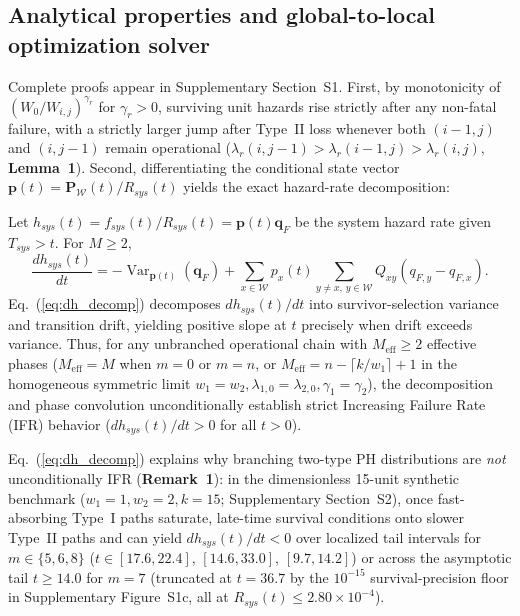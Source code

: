 \documentclass{elektr}
\begin{document}
\subsection{Analytical properties and global-to-local optimization solver}
Complete proofs appear in Supplementary Section~S1. First, by monotonicity of $(W_0/W_{i,j})^{\gamma_r}$ for $\gamma_r > 0$, surviving unit hazards rise strictly after any non-fatal failure, with a strictly larger jump after Type~II loss whenever both $(i-1,j)$ and $(i,j-1)$ remain operational ($\lambda_r(i, j-1) > \lambda_r(i-1, j) > \lambda_r(i, j)$, \textbf{Lemma~1}). Second, differentiating the conditional state vector $\mathbf{p}(t) = \mathbf{P}_{\mathcal{W}}(t)/R_{sys}(t)$ yields the exact hazard-rate decomposition:
\begin{proposition}
Let $h_{sys}(t) = f_{sys}(t)/R_{sys}(t) = \mathbf{p}(t)\mathbf{q}_F$ be the system hazard rate given $T_{sys} > t$. For $M \ge 2$,
\begin{equation}
\frac{d h_{sys}(t)}{dt} = -\operatorname{Var}_{\mathbf{p}(t)}(\mathbf{q}_F) + \sum_{x \in \mathcal{W}} p_x(t) \sum_{y \neq x, \, y \in \mathcal{W}} Q_{xy} \left(q_{F,y} - q_{F,x}\right).
\label{eq:dh_decomp}
\end{equation}
Eq.~(\ref{eq:dh_decomp}) decomposes $dh_{sys}(t)/dt$ into survivor-selection variance and transition drift, yielding positive slope at $t$ precisely when drift exceeds variance. Thus, for any unbranched operational chain with $M_{\mathrm{eff}} \ge 2$ effective phases ($M_{\mathrm{eff}} = M$ when $m=0$ or $m=n$, or $M_{\mathrm{eff}} = n - \lceil k/w_1 \rceil + 1$ in the homogeneous symmetric limit $w_1=w_2, \lambda_{1,0}=\lambda_{2,0}, \gamma_1=\gamma_2$), the decomposition and phase convolution unconditionally establish strict Increasing Failure Rate (IFR) behavior ($dh_{sys}(t)/dt > 0$ for all $t > 0$).
\end{proposition}
Eq.~(\ref{eq:dh_decomp}) explains why branching two-type PH distributions are \emph{not} unconditionally IFR (\textbf{Remark~1}): in the dimensionless 15-unit synthetic benchmark ($w_1=1, w_2=2, k=15$; Supplementary Section~S2), once fast-absorbing Type~I paths saturate, late-time survival conditions onto slower Type~II paths and can yield $dh_{sys}(t)/dt < 0$ over localized tail intervals for $m \in \{5,6,8\}$ ($t \in [17.6, 22.4]$, $[14.6, 33.0]$, $[9.7, 14.2]$) or across the asymptotic tail $t \ge 14.0$ for $m = 7$ (truncated at $t = 36.7$ by the $10^{-15}$ survival-precision floor in Supplementary Figure~S1c, all at $R_{sys}(t) \le 2.80 \times 10^{-4}$).
\end{document}
